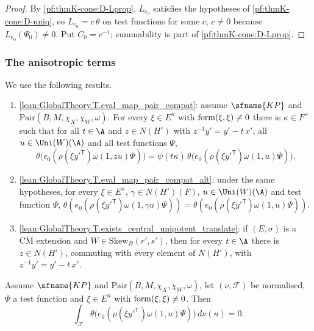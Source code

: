 \begin{proof}
By \ref{pf:thmK-cone:D-Lprop}, $L_{e_0}$ satisfies the hypotheses of \ref{pf:thmK-cone:D-uniq}, so $L_{e_0}=c\,\theta$ on
test functions for some $c$; $c\neq0$ because $L_{e_0}(\Psi_0)\neq0$.  Put $C_0=c^{-1}$; summability is part of
\ref{pf:thmK-cone:D-Lprop}.
\end{proof}

\subsubsection{The anisotropic terms}
We use the following results.
\begin{enumerate}[resume*=thmKconeD]
\item\label{pf:thmK-cone:D-phase} \cref{lean:GlobalTheory.T.eval_map_pair_compat}: assume $\sfname{KP}$ and
  $\mathrm{Pair}(B,M,\chi_X,\chi_W,\omega)$.  For every $\xi\in E^n$ with $\operatorname{form}(\xi,\xi)\neq0$ there is
  $\kappa\in F^\times$ such that for all $t\in\A$ and $z\in N(H')$ with $z^{-1}y'=y'-t\,x'$, all
  $u\in\Uni(W)(\A)$ and all test functions $\Psi$,
  \[
    \theta\bigl(e_0(\rho(\xi y'^{\mathsf T})\omega(1,zu)\Psi)\bigr)=\psi(t\kappa)\,
    \theta\bigl(e_0(\rho(\xi y'^{\mathsf T})\omega(1,u)\Psi)\bigr).
  \]
\item\label{pf:thmK-cone:D-ratinv} \cref{lean:GlobalTheory.T.eval_map_pair_compat_alt}: under the same hypotheses, for
  every $\xi\in E^n$, $\gamma\in N(H')(F)$, $u\in\Uni(W)(\A)$ and test function $\Psi$,
  $\theta(e_0(\rho(\xi y'^{\mathsf T})\omega(1,\gamma u)\Psi))=\theta(e_0(\rho(\xi y'^{\mathsf T})\omega(1,u)\Psi))$.
\item\label{pf:thmK-cone:D-central} \cref{lean:GlobalTheory.T.exists_central_unipotent_translate}: if $(E,\sigma)$ is a
  CM extension and $W\in\mathrm{Skew}_B(r',s')$, then for every $t\in\A$ there is $z\in N(H')$, commuting with every
  element of $N(H')$, with $z^{-1}y'=y'-t\,x'$.
\end{enumerate}

\begin{lemma}\label{pf:thmK-cone:aniso}
Assume $\sfname{KP}$ and $\mathrm{Pair}(B,M,\chi_X,\chi_W,\omega)$, let $(\nu,\mathcal F)$ be normalised, $\Psi$ a test
function and $\xi\in E^n$ with $\operatorname{form}(\xi,\xi)\neq0$.  Then
\[
  \int_{\mathcal F}\theta\bigl(e_0(\rho(\xi y'^{\mathsf T})\omega(1,u)\Psi)\bigr)\,d\nu(u)=0.
\]
\end{lemma}

